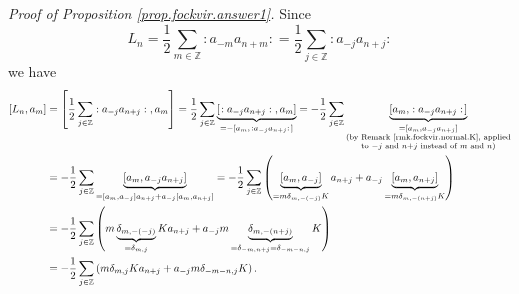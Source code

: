 \documentclass
[numbers=enddot,12pt,final,onecolumn,german,notitlepage]{scrartcl}%
\theoremstyle{definition}
\begin{document}
\textit{Proof of Proposition \ref{prop.fockvir.answer1}.} Since%
\[
L_{n}=\dfrac{1}{2}\sum\limits_{m\in\mathbb{Z}}\left.  :a_{-m}a_{n+m}:\right.
=\dfrac{1}{2}\sum\limits_{j\in\mathbb{Z}}\left.  :a_{-j}a_{n+j}:\right.
\]
we have%
\begin{align}
\left[  L_{n},a_{m}\right]   &  =\left[  \dfrac{1}{2}\sum\limits_{j\in
\mathbb{Z}}\left.  :a_{-j}a_{n+j}:\right.  ,a_{m}\right]  =\dfrac{1}{2}%
\sum\limits_{j\in\mathbb{Z}}\underbrace{\left[  \left.  :a_{-j}a_{n+j}%
:\right.  ,a_{m}\right]  }_{=-\left[  a_{m},\left.  :a_{-j}a_{n+j}:\right.
\right]  }=-\dfrac{1}{2}\sum\limits_{j\in\mathbb{Z}}\underbrace{\left[
a_{m},\left.  :a_{-j}a_{n+j}:\right.  \right]  }_{\substack{=\left[
a_{m},a_{-j}a_{n+j}\right]  \\\text{(by Remark \ref{rmk.fockvir.normal.K},
applied}\\\text{to }-j\text{ and }n+j\text{ instead of }m\text{ and }%
n\text{)}}}\nonumber\\
&  =-\dfrac{1}{2}\sum\limits_{j\in\mathbb{Z}}\underbrace{\left[  a_{m}%
,a_{-j}a_{n+j}\right]  }_{=\left[  a_{m},a_{-j}\right]  a_{n+j}+a_{-j}\left[
a_{m},a_{n+j}\right]  }=-\dfrac{1}{2}\sum\limits_{j\in\mathbb{Z}}\left(
\underbrace{\left[  a_{m},a_{-j}\right]  }_{=m\delta_{m,-\left(  -j\right)
}K}a_{n+j}+a_{-j}\underbrace{\left[  a_{m},a_{n+j}\right]  }_{=m\delta
_{m,-\left(  n+j\right)  }K}\right) \nonumber\\
&  =-\dfrac{1}{2}\sum\limits_{j\in\mathbb{Z}}\left(  m\underbrace{\delta
_{m,-\left(  -j\right)  }}_{=\delta_{m,j}}Ka_{n+j}+a_{-j}m\underbrace{\delta
_{m,-\left(  n+j\right)  }}_{=\delta_{-m,n+j}=\delta_{-m-n,j}}K\right)
\nonumber\\
&  =-\dfrac{1}{2}\sum\limits_{j\in\mathbb{Z}}\left(  m\delta_{m,j}%
Ka_{n+j}+a_{-j}m\delta_{-m-n,j}K\right)  . \label{pf.fockvir.answer1.2}%
\end{align}
\end{document}
